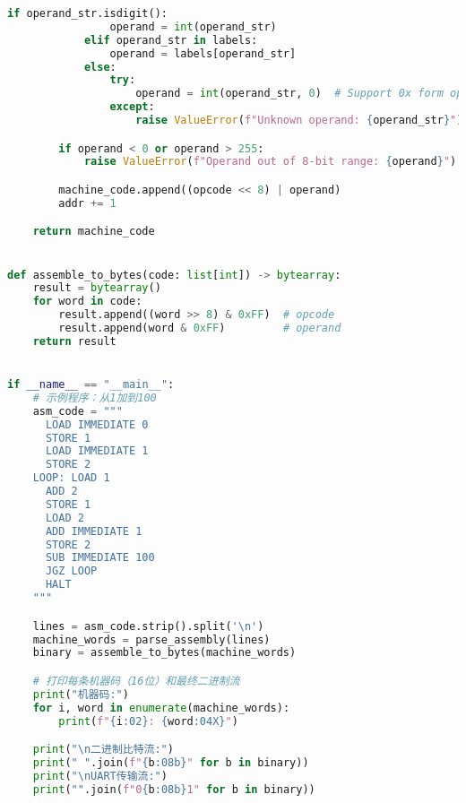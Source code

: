 \documentclass[lang=cn,a4paper,newtx]{elegantpaper}
\begin{document}
\begin{appendices}
\begin{lstlisting}[language=python,caption={convert.py}]
            if operand_str.isdigit():
                operand = int(operand_str)
            elif operand_str in labels:
                operand = labels[operand_str]
            else:
                try:
                    operand = int(operand_str, 0)  # Support 0x form operand
                except:
                    raise ValueError(f"Unknown operand: {operand_str}")

        if operand < 0 or operand > 255:
            raise ValueError(f"Operand out of 8-bit range: {operand}")

        machine_code.append((opcode << 8) | operand)
        addr += 1

    return machine_code


def assemble_to_bytes(code: list[int]) -> bytearray:
    result = bytearray()
    for word in code:
        result.append((word >> 8) & 0xFF)  # opcode
        result.append(word & 0xFF)         # operand
    return result


if __name__ == "__main__":
    # 示例程序：从1加到100
    asm_code = """
      LOAD IMMEDIATE 0
      STORE 1
      LOAD IMMEDIATE 1
      STORE 2
    LOOP: LOAD 1
      ADD 2
      STORE 1
      LOAD 2
      ADD IMMEDIATE 1
      STORE 2
      SUB IMMEDIATE 100
      JGZ LOOP
      HALT
    """

    lines = asm_code.strip().split('\n')
    machine_words = parse_assembly(lines)
    binary = assemble_to_bytes(machine_words)

    # 打印每条机器码（16位）和最终二进制流
    print("机器码:")
    for i, word in enumerate(machine_words):
        print(f"{i:02}: {word:04X}")

    print("\n二进制比特流:")
    print(" ".join(f"{b:08b}" for b in binary))
    print("\nUART传输流:")
    print("".join(f"0{b:08b}1" for b in binary))

    

  \end{lstlisting}
\end{appendices}
\end{document}
